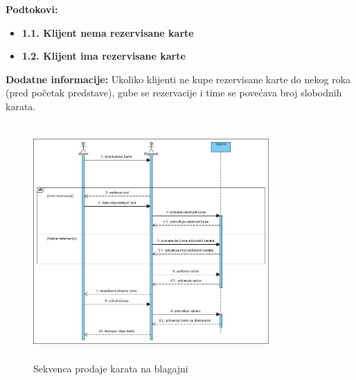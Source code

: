 \documentclass[a4paper]{article}
\begin{document}
  \noindent\textbf{Podtokovi:}
  \begin{itemize}
    \item \textbf{1.1. Klijent nema rezervisane karte}
    \item \textbf{1.2. Klijent ima rezervisane karte}
  \end{itemize}

\noindent\textbf{Dodatne informacije:} Ukoliko klijenti ne kupe rezervisane karte do nekog roka (pred početak predstave),
gube se rezervacije i time se povećava broj slobodnih karata.

\begin{figure}[H]
  \begin{center}
      \includegraphics[width=90mm,height=90mm]{../images/sequence_prodaja_karata.jpg}
  \end{center}
  \caption{Sekvenca prodaje karata na blagajni}
  \label{sequence_prodaja_karata}
\end{figure}
\end{document}
